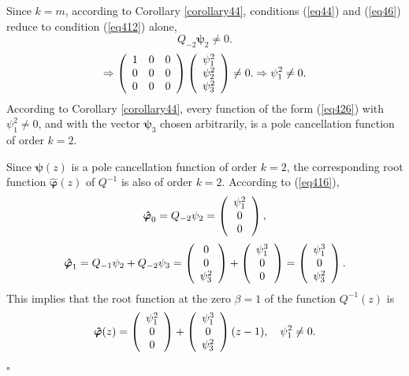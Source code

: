 \documentclass[11pt, reqno]{amsart}
\theoremstyle{plain}
\theoremstyle{remark}
\numberwithin{equation}{section}
\begin{document}
Since $k=m$, according to Corollary \ref{corollary44}, conditions (\ref{eq44}) and (\ref{eq46}) reduce to condition (\ref{eq412}) alone,
\[
Q_{-2}\boldsymbol{\psi}_{2}\neq 0.
\]
\[
\Rightarrow \left( {\begin{array}{*{20}c}
1 & 0 & 0\\
0 &  0 & 0\\
0 &  0 & 0\\
\end{array} } \right)\left( {\begin{array}{*{20}c}
\psi_{1}^{2} \\
\psi_{2}^{2}\\
\psi_{3}^{2}\\
\end{array} } \right) \neq 0.\Rightarrow \psi_{1}^{2} \neq 0.
\]
According to Corollary \ref{corollary44}, every function of the form (\ref{eq426}) with $\psi_{1}^{2} \neq 0$, and with the vector $\boldsymbol{\psi}_{3}$ chosen arbitrarily, is a pole cancellation function of order $k=2$.

Since $\boldsymbol{\psi}(z)$ is a pole cancellation function of order $k=2$, the corresponding root function $\boldsymbol{\hat{\varphi}}(z)$ of $Q^{-1}$ is also of order $k=2$. According to (\ref{eq416}),
\[
\boldsymbol{\hat{\varphi}}_{0}=Q_{-2}\psi_{2}=\left( {\begin{array}{*{20}c}
\psi_{1}^{2} \\
0\\
0\\
\end{array} } \right),
\]
\[
\boldsymbol{\hat{\varphi}}_{1}=Q_{-1}\psi_{2}+Q_{-2}\psi_{3}=\left( {\begin{array}{*{20}c}
0 \\
0 \\
\psi_{3}^{2}\\
\end{array} } \right)+ \left( {\begin{array}{*{20}c}
\psi_{1}^{3} \\
0 \\
0\\
\end{array} } \right)=\left( {\begin{array}{*{20}c}
\psi_{1}^{3}  \\
0 \\
\psi_{3}^{2}\\
\end{array} } \right).
\] 
This implies that the root function at the zero $\beta=1$ of the function $Q^{-1}(z)$ is
\[
\boldsymbol{\hat{\varphi}}(z)=\left( {\begin{array}{*{20}c}
\psi_{1}^{2} \\
0\\
0\\
\end{array} } \right)+\left( {\begin{array}{*{20}c}
\psi_{1}^{3} \\
0 \\
\psi_{3}^{2}\\
\end{array} } \right)(z-1), \quad \psi_{1}^{2}\neq 0.
\] 
\hfill $\square$
\end{document}
